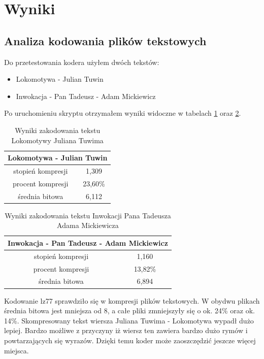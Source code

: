 \documentclass[12pt]{article}
\begin{document}
\section{Wyniki}\label{results}
\subsection{Analiza kodowania plików tekstowych}
Do przetestowania kodera użyłem dwóch tekstów:
\begin{itemize}
  \item Lokomotywa - Julian Tuwin
  \item Inwokacja - Pan Tadeusz - Adam Mickiewicz
\end{itemize}
Po uruchomieniu skryptu otrzymałem wyniki widoczne w tabelach \ref{text:1} oraz \ref{text:2}.
\begin{table}[ht!]
  \centering
  \begin{tabular}{|c|c|}
    \hline
    \multicolumn{2}{|c|}{Lokomotywa - Julian Tuwin} \\
    \hline
    \hline
    stopień kompresji & 1,309\\
    procent kompresji & 23,60\%\\
    średnia bitowa & 6,112 \\
    \hline
  \end{tabular}
  \caption{Wyniki zakodowania tekstu Lokomotywy Juliana Tuwima}
  \label{text:1}
\end{table}
\begin{table}[ht!]
  \centering
  \begin{tabular}{|c|c|}
    \hline
    \multicolumn{2}{|c|}{Inwokacja - Pan Tadeusz - Adam Mickiewicz} \\
    \hline
    \hline
    stopień kompresji & 1,160\\
    procent kompresji & 13,82\%\\
    średnia bitowa & 6,894 \\
    \hline
  \end{tabular}
  \caption{Wyniki zakodowania tekstu Inwokacji Pana Tadeusza Adama Mickiewicza}
  \label{text:2}
\end{table}

Kodowanie lz77 sprawdziło się w kompresji plików tekstowych.
W obydwu plikach średnia bitowa jest mniejsza od 8, a całe pliki zmniejszyły się o ok. 24\% oraz ok. 14\%.
Skompresowany tekst wiersza Juliana Tuwima - Lokomotywa wypadł dużo lepiej. Bardzo możliwe z przyczyny iż wiersz ten zawiera bardzo dużo rymów i powtarzających się wyrazów.
Dzięki temu koder może zaoszczędzić jeszcze więcej miejsca.
\end{document}
